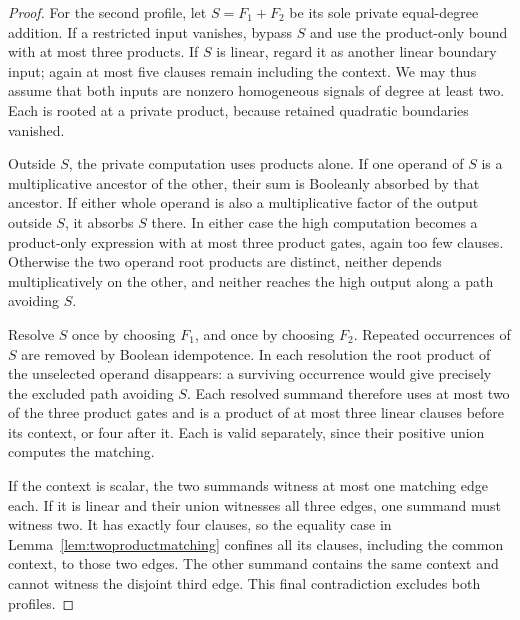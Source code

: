 \documentclass[11pt]{article}
\theoremstyle{definition}
\theoremstyle{remark}
\begin{document}
\begin{proof}
For the second profile, let $S=F_1+F_2$ be its sole private equal-degree addition. If a restricted input vanishes, bypass $S$ and use the product-only bound with at most three products. If $S$ is linear, regard it as another linear boundary input; again at most five clauses remain including the context. We may thus assume that both inputs are nonzero homogeneous signals of degree at least two. Each is rooted at a private product, because retained quadratic boundaries vanished.

Outside $S$, the private computation uses products alone. If one operand of $S$ is a multiplicative ancestor of the other, their sum is Booleanly absorbed by that ancestor. If either whole operand is also a multiplicative factor of the output outside $S$, it absorbs $S$ there. In either case the high computation becomes a product-only expression with at most three product gates, again too few clauses. Otherwise the two operand root products are distinct, neither depends multiplicatively on the other, and neither reaches the high output along a path avoiding $S$.

Resolve $S$ once by choosing $F_1$, and once by choosing $F_2$. Repeated occurrences of $S$ are removed by Boolean idempotence. In each resolution the root product of the unselected operand disappears: a surviving occurrence would give precisely the excluded path avoiding $S$. Each resolved summand therefore uses at most two of the three product gates and is a product of at most three linear clauses before its context, or four after it. Each is valid separately, since their positive union computes the matching.

If the context is scalar, the two summands witness at most one matching edge each. If it is linear and their union witnesses all three edges, one summand must witness two. It has exactly four clauses, so the equality case in Lemma~\ref{lem:twoproductmatching} confines all its clauses, including the common context, to those two edges. The other summand contains the same context and cannot witness the disjoint third edge. This final contradiction excludes both profiles.
\end{proof}
\end{document}
